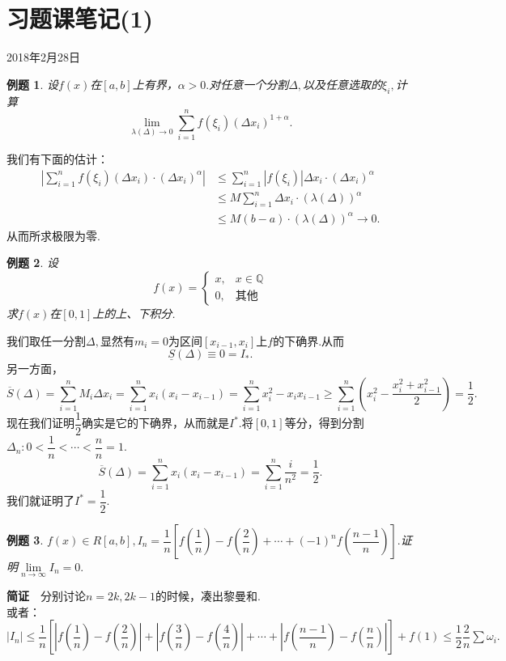 \documentclass[UTF8]{article}
\newcommand{\jz}{\textbf{简证}$\quad$}
\newtheorem{exa}{\hspace{2em}例题}[section]
\begin{document}
\section{习题课笔记(1)}
\begin{center}
  2018年2月28日
\end{center}
\begin{exa}
  设$f(x)$在$[a,b]$上有界，$\alpha>0.$对任意一个分割$\Delta,$以及任意选取的$\xi_i,$计算
  $$\lim_{\lambda(\Delta)\to0}\sum_{i=1}^nf(\xi_i)(\Delta x_i)^{1+\alpha}.$$
\end{exa}
我们有下面的估计：
\begin{align*}
  \left|\sum_{i=1}^nf(\xi_i)(\Delta x_i)\cdot(\Delta x_i)^\alpha\right|
  &\le\sum_{i=1}^n|f(\xi_i)|\Delta x_i\cdot(\Delta x_i)^\alpha\\
  &\le M\sum_{i=1}^n\Delta x_i\cdot(\lambda(\Delta))^\alpha\\
  &\le M(b-a)\cdot(\lambda(\Delta))^\alpha\to0.
\end{align*}
从而所求极限为零.
\begin{exa}
  设
  \[
    f(x)=
    \begin{cases}
      x,&x\in\mathbb{Q}\\
      0,&\text{其他}
    \end{cases}
  \]
  求$f(x)$在$[0,1]$上的上、下积分.
\end{exa}
我们取任一分割$\Delta,$显然有$m_i=0$为区间$[x_{i-1},x_i]$上$f$的下确界.从而
$$\underline{S}(\Delta)\equiv0=I_*.$$
另一方面，
$$\overline{S}(\Delta)=\sum_{i=1}^nM_i\Delta x_i=\sum_{i=1}^nx_i(x_i-x_{i-1})=\sum_{i=1}^nx_i^2-x_ix_{i-1}\ge
\sum_{i=1}^n\left(x_i^2-\frac{x_i^2+x_{i-1}^2}{2}\right)=\frac{1}{2}.$$
现在我们证明$\dfrac{1}{2}$确实是它的下确界，从而就是$I^*.$将$[0,1]$等分，得到分割$\Delta_n:0<\dfrac{1}{n}<\cdots<\dfrac{n}{n}=1.$
$$\overline{S}(\Delta)=\sum_{i=1}^nx_i(x_i-x_{i-1})=\sum_{i=1}^n\frac{i}{n^2}=\frac{1}{2}.$$
我们就证明了$I^*=\dfrac{1}{2}.$
\begin{exa}
  $f(x)\in R[a,b],$$I_n=\dfrac{1}{n}\left[f\left(\dfrac{1}{n}\right)-f\left(\dfrac{2}{n}\right)+\cdots+
  (-1)^nf\left(\dfrac{n-1}{n}\right)\right].$证明$\lim\limits_{n\to\infty}I_n=0.$
\end{exa}
\jz 分别讨论$n=2k,2k-1$的时候，凑出黎曼和.\\或者：$|I_n|\le\dfrac{1}{n}\left[\left|f\left(\dfrac{1}{n}\right)-
f\left(\dfrac{2}{n}\right)\right|+
\left|f\left(\dfrac{3}{n}\right)-f\left(\dfrac{4}{n}\right)\right|+\cdots+
\left|f\left(\dfrac{n-1}{n}\right)-f\left(\dfrac{n}{n}\right)\right|\right]+
f\left(1\right)\le\dfrac{1}{2}\dfrac{2}{n}\sum\omega_i.$
\clearpage
\end{document}
